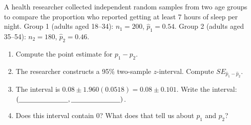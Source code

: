 \documentclass[10pt]{article}
\begin{document}
\namedateperiod

\vspace{0.15in}

A health researcher collected independent random samples from two age groups to compare the
proportion who reported getting at least 7 hours of sleep per night.
Group 1 (adults aged 18--34): $n_1 = 200$, $\hat p_1 = 0.54$.
Group 2 (adults aged 35--54): $n_2 = 180$, $\hat p_2 = 0.46$.

\begin{enumerate}
  \item Compute the point estimate for $p_1 - p_2$. \blank{4cm}

  \item The researcher constructs a 95\% two-sample $z$-interval.
        Compute $SE_{\hat p_1 - \hat p_2}$.

  \item The interval is $0.08 \pm 1.960(0.0518) = 0.08 \pm 0.101$.
        Write the interval: $(\blank{2.5cm}, \blank{2.5cm})$.

  \item Does this interval contain 0? \blank{2cm} \quad
        What does that tell us about $p_1$ and $p_2$? \writeline
\end{enumerate}
\end{document}
